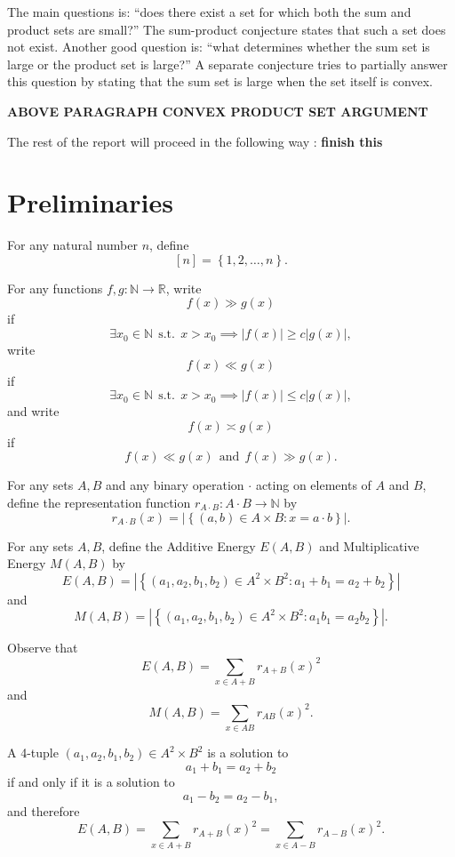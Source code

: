 \documentclass[12pt]{amsart}
\begin{document}
The main questions is: ``does there exist a set for which both the sum and product sets are small?''
The sum-product conjecture states that such a set does not exist. Another good question is: ``what
determines whether the sum set is large or the product set is large?'' A separate
conjecture tries to partially answer this question by stating that the sum set is large
when the set itself is convex.

\textbf{ABOVE PARAGRAPH CONVEX PRODUCT SET ARGUMENT}

The rest of the report will proceed in the following way : \textbf{finish this}

\section{Preliminaries}

For any natural number \(n\), define
\[
    [n] = \left\{ 1, 2 , \dots , n \right\} 
.\]

For any functions \(f,g: \mathbb{N}  \to \mathbb{R} \), write
\[
    f(x) \gg g(x) 
\]
if
\[
    \exists x_0 \in \mathbb{N} ~~\text{s.t.}~~ x > x_0 \implies \left\lvert f(x) \right\rvert \geq c \left\lvert g(x) \right\rvert  
,\]
write
\[
    f(x) \ll g(x) 
\]
if
\[
    \exists x_0 \in \mathbb{N} ~~\text{s.t.}~~ x > x_0 \implies \left\lvert f(x) \right\rvert \leq c \left\lvert g(x) \right\rvert 
,\]
and write
\[
    f(x) \asymp g(x)
\]
if
\[
    f(x) \ll g(x) ~ ~ \text{and} ~ ~ f(x) \gg g(x)
.\]

For any sets \(A,B\) and any binary operation \(\cdot \) acting on elements of \(A\) and \(B\), define the representation function
\(r_{A \cdot B} : A \cdot B \to \mathbb{N} \) by
\[
    r_{A \cdot B} (x) = \left\lvert \left\{ (a,b)\in  A \times B : x = a \cdot b \right\}  \right\rvert
.\]

For any sets \(A,B\), define the Additive Energy \(E(A,B)\) and Multiplicative Energy \(M(A,B)\) by
\[
    E(A,B) = \left\lvert \left\{ (a_1,a_2,b_1,b_2) \in A^{2} \times B^{2} : a_1 + b_1 = a_2 + b_2 \right\}  \right\rvert 
\]
and
\[
    M(A,B) = \left\lvert \left\{ (a_1,a_2,b_1,b_2)\in  A^{2} \times B^{2} : a_1b_1 = a_2b_2 \right\}  \right\rvert
.\]

Observe that
\[
    E(A,B) = \sum _{x \in A + B} r_{A+B} (x)^{2}
\]
and
\[
    M(A,B) = \sum _{x \in AB} r_{AB} (x)^{2} 
.\]

A 4-tuple \((a_1,a_2,b_1,b_2)\in A^{2} \times B^{2}\) is a solution to
\[
    a_1 + b_1 = a_2 + b_2
\]
if and only if it is a solution to
\[
    a_1-b_2 = a_2-b_1
,\]
and therefore
\[
    E(A,B) = \sum _{x \in A + B} r_{A+B} (x)^{2} = \sum _{x \in A - B} r_{A-B} (x)^{2}
.\]
\end{document}
